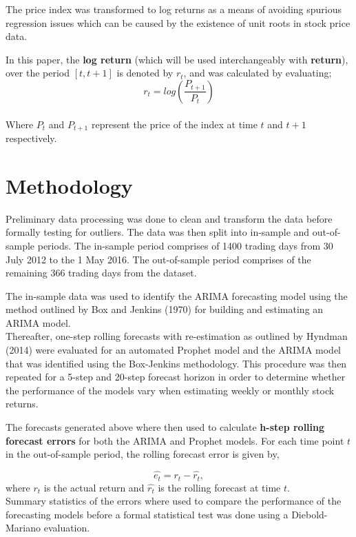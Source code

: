 \documentclass[12pt,a4paper]{article}
\numberwithin{equation}{section}
\numberwithin{figure}{section}
\numberwithin{table}{section}
\begin{document}
The price index was transformed to log returns as a means of avoiding
spurious regression issues which can be caused by the existence of unit
roots in stock price data.

In this paper, the \textbf{log return} (which will be used
interchangeably with \textbf{return}), over the period \([t,t+1]\) is
denoted by \(r_t\), and was calculated by evaluating;\\
\[
r_t = log(\frac{P_{t+1}}{P_t})  \label{eq1}
\]\\
Where \(P_t\) and \(P_{t+1}\) represent the price of the index at time
\(t\) and \(t+1\) respectively.

\section{Methodology}\label{methodology}

Preliminary data processing was done to clean and transform the data
before formally testing for outliers. The data was then split into
in-sample and out-of-sample periods. The in-sample period comprises of
1400 trading days from 30 July 2012 to the 1 May 2016. The out-of-sample
period comprises of the remaining 366 trading days from the dataset.

The in-sample data was used to identify the ARIMA forecasting model
using the method outlined by Box and Jenkins (1970) for building and
estimating an ARIMA model.\\
Thereafter, one-step rolling forecasts with re-estimation as outlined by
Hyndman (2014) were evaluated for an automated Prophet model and the
ARIMA model that was identified using the Box-Jenkins methodology. This
procedure was then repeated for a 5-step and 20-step forecast horizon in
order to determine whether the performance of the models vary when
estimating weekly or monthly stock returns.

The forecasts generated above where then used to calculate
\textbf{h-step rolling forecast errors} for both the ARIMA and Prophet
models. For each time point \(t\) in the out-of-sample period, the
rolling forecast error is given by,

\[ \hat{e_t} = r_t - \hat{r_t},\] where \(r_t\) is the actual return and
\(\hat{r_t}\) is the rolling forecast at time \(t\).\\
Summary statistics of the errors where used to compare the performance
of the forecasting models before a formal statistical test was done
using a Diebold-Mariano evaluation.
\end{document}
